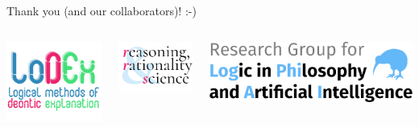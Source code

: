 \documentclass[aspectratio=169]{beamer}
\begin{document}
\begin{frame}[label={sec:orgcbf8e3f}]{}
Thank you (and our collaborators)! :-)

\vspace{2cm}

\begin{columns}
\begin{column}{.3\columnwidth}
\begin{center}
\includegraphics[width=.9\textwidth]{./images/logo-lodex.png}
\end{center}
\end{column}
\begin{column}{.3\columnwidth}
\begin{center}
\includegraphics[width=.9\textwidth]{images/rrs-logo.png}
\end{center}
\end{column}
\begin{column}{.3\columnwidth}
\begin{center}
\includegraphics[width=.9\textwidth]{images/logo-lpai.png}
\end{center}
\end{column}
\end{columns}
\end{frame}
\end{document}
